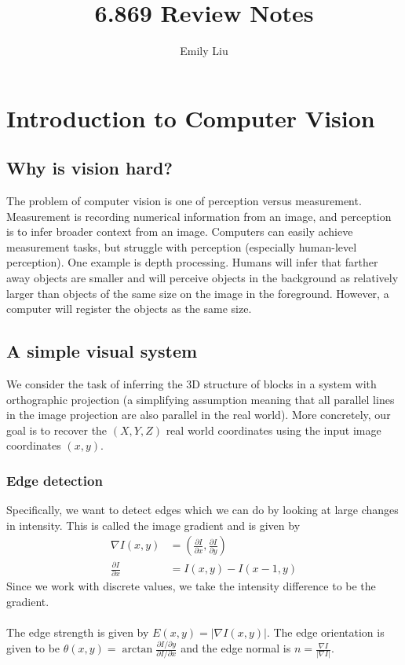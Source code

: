 \documentclass{article}
\title{6.869 Review Notes}
\author{Emily Liu}
\begin{document}
\maketitle

\section{Introduction to Computer Vision}

\subsection*{Why is vision hard?}
The problem of computer vision is one of perception versus measurement. Measurement is recording numerical information from an image, and perception is to infer broader context from an image. Computers can easily achieve measurement tasks, but struggle with perception (especially human-level perception). One example is depth processing. Humans will infer that farther away objects are smaller and will perceive objects in the background as relatively larger than objects of the same size on the image in the foreground. However, a computer will register the objects as the same size.

\subsection*{A simple visual system}
We consider the task of inferring the 3D structure of blocks in a system with orthographic projection (a simplifying assumption meaning that all parallel lines in the image projection are also parallel in the real world). More concretely, our goal is to recover the $(X, Y, Z)$ real world coordinates using the input image coordinates $(x, y)$.

\subsubsection*{Edge detection}
Specifically, we want to detect edges which we can do by looking at large changes in intensity. This is called the image gradient and is given by
\begin{align*}
    \nabla I(x, y) &= \left(\frac{\partial I}{\partial x}, \frac{\partial I}{\partial y}\right)\\
    \frac{\partial I}{\partial x} &= I(x, y) - I(x-1, y)
\end{align*}
Since we work with discrete values, we take the intensity difference to be the gradient.
\\
\\
The edge strength is given by $E(x, y) = |\nabla I(x, y)|$. The edge orientation is given to be $\theta (x, y) = \arctan \frac{\partial I / \partial y}{\partial I / \partial x}$ and the edge normal is $n = \frac{\nabla I}{|\nabla I|}$.
\end{document}
